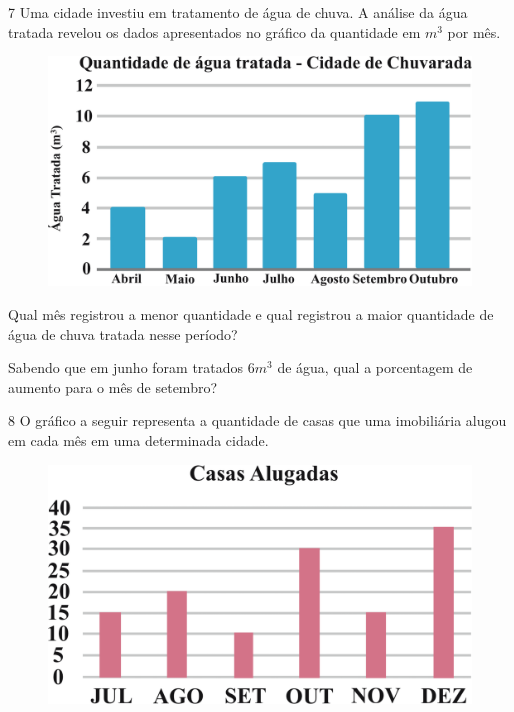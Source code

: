 \pagebreak  
\num{7} Uma cidade investiu em tratamento de água de chuva. A análise da água
tratada revelou os dados apresentados no gráfico da quantidade em $m^3$ por
mês.

\begin{figure}[htpb!]
\centering
\includegraphics[width=\textwidth]{./ilustras-mat/modulo_13-atividade_7.png}
\end{figure}

\begin{escolha}

  \item Qual mês registrou a menor quantidade e qual registrou a maior
  quantidade de água de chuva tratada nesse período?\\

  \item Sabendo que em junho foram tratados $6m^3$ de água, qual a porcentagem
  de aumento para o mês de setembro?\\
\end{escolha}

\pagebreak
\num{8} O gráfico a seguir representa a quantidade de casas que uma
imobiliária alugou em cada mês em uma determinada cidade.

\begin{figure}[htpb!]
\centering
\includegraphics[width=.6\textwidth]{./ilustras-mat/modulo_13-atividade_8.png}
\end{figure}

